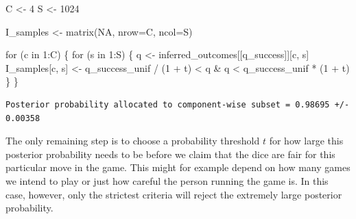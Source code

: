 \documentclass[
  letterpaper,
  DIV=11,
  numbers=noendperiod]{scrartcl}
\newenvironment{Shaded}{\begin{snugshade}}{\end{snugshade}}
\newcommand{\AttributeTok}[1]{\textcolor[rgb]{0.40,0.45,0.13}{#1}}
\newcommand{\ConstantTok}[1]{\textcolor[rgb]{0.56,0.35,0.01}{#1}}
\newcommand{\ControlFlowTok}[1]{\textcolor[rgb]{0.00,0.23,0.31}{#1}}
\newcommand{\DecValTok}[1]{\textcolor[rgb]{0.68,0.00,0.00}{#1}}
\newcommand{\FunctionTok}[1]{\textcolor[rgb]{0.28,0.35,0.67}{#1}}
\newcommand{\NormalTok}[1]{\textcolor[rgb]{0.00,0.23,0.31}{#1}}
\newcommand{\OtherTok}[1]{\textcolor[rgb]{0.00,0.23,0.31}{#1}}
\newcommand{\SpecialCharTok}[1]{\textcolor[rgb]{0.37,0.37,0.37}{#1}}
\newcommand{\StringTok}[1]{\textcolor[rgb]{0.13,0.47,0.30}{#1}}
\begin{document}
\begin{Shaded}
\begin{Highlighting}[]
\NormalTok{C }\OtherTok{\textless{}{-}} \DecValTok{4}
\NormalTok{S }\OtherTok{\textless{}{-}} \DecValTok{1024}

\NormalTok{I\_samples }\OtherTok{\textless{}{-}} \FunctionTok{matrix}\NormalTok{(}\ConstantTok{NA}\NormalTok{, }\AttributeTok{nrow=}\NormalTok{C, }\AttributeTok{ncol=}\NormalTok{S)}

\ControlFlowTok{for}\NormalTok{ (c }\ControlFlowTok{in} \DecValTok{1}\SpecialCharTok{:}\NormalTok{C) \{}
  \ControlFlowTok{for}\NormalTok{ (s }\ControlFlowTok{in} \DecValTok{1}\SpecialCharTok{:}\NormalTok{S) \{}
\NormalTok{    q }\OtherTok{\textless{}{-}}\NormalTok{ inferred\_outcomes[[}\StringTok{\textquotesingle{}q\_success\textquotesingle{}}\NormalTok{]][c, s]}
\NormalTok{    I\_samples[c, s] }\OtherTok{\textless{}{-}}\NormalTok{ q\_success\_unif }\SpecialCharTok{/}\NormalTok{ (}\DecValTok{1} \SpecialCharTok{+}\NormalTok{ t) }\SpecialCharTok{\textless{}}\NormalTok{ q }\SpecialCharTok{\&}
\NormalTok{                       q }\SpecialCharTok{\textless{}}\NormalTok{ q\_success\_unif }\SpecialCharTok{*}\NormalTok{ (}\DecValTok{1} \SpecialCharTok{+}\NormalTok{ t)}
\NormalTok{  \}}
\NormalTok{\}}
\end{Highlighting}
\end{Shaded}

\begin{Shaded}
\end{Shaded}

\begin{verbatim}
Posterior probability allocated to component-wise subset = 0.98695 +/- 0.00358
\end{verbatim}

The only remaining step is to choose a probability threshold \(t\) for
how large this posterior probability needs to be before we claim that
the dice are fair for this particular move in the game. This might for
example depend on how many games we intend to play or just how careful
the person running the game is. In this case, however, only the
strictest criteria will reject the extremely large posterior
probability.
\end{document}
